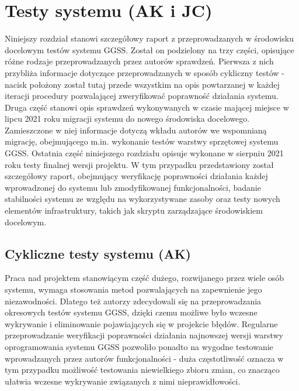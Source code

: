 \chapter{Testy systemu (AK i JC)}
\label{cha:tests}
Niniejszy rozdział stanowi szczegółowy raport z przeprowadzanych w środowisku docelowym testów systemu GGSS. Został on podzielony na trzy części, opisujące różne rodzaje przeprowadzanych przez autorów sprawdzeń. Pierwsza z nich przybliża informacje dotyczące przeprowadzanych w sposób cykliczny testów - nacisk położony został tutaj przede wszystkim na opis powtarzanej w każdej iteracji procedury pozwalającej zweryfikować poprawność działania systemu. Druga część stanowi opis sprawdzeń wykonywanych w czasie mającej miejsce w lipcu 2021 roku migracji systemu do nowego środowiska docelowego. Zamieszczone w niej informacje dotyczą wkładu autorów we wspomnianą migrację, obejmującego m.in. wykonanie testów warstwy sprzętowej systemu GGSS. Ostatnia część niniejszego rozdziału opisuje wykonane w sierpniu 2021 roku testy finalnej wersji projektu. W tym przypadku przedstawiony został szczegółowy raport, obejmujący weryfikację poprawności działania każdej wprowadzonej do systemu lub zmodyfikowanej funkcjonalności, badanie stabilności systemu ze względu na wykorzystywane zasoby oraz testy nowych elementów infrastruktury, takich jak skryptu zarządzające środowiskiem docelowym.

\section{Cykliczne testy systemu (AK)}
Praca nad projektem stanowiącym część dużego, rozwijanego przez wiele osób systemu, wymaga stosowania metod pozwalających na zapewnienie jego niezawodności. Dlatego też autorzy zdecydowali się na przeprowadzania okresowych testów systemu GGSS, dzięki czemu możliwe było wczesne wykrywanie i eliminowanie pojawiających się w projekcie błędów. Regularne przeprowadzanie weryfikacji poprawności działania najnowszej wersji warstwy oprogramowania systemu GGSS pozwoliło ponadto na wygodne testowanie wprowadzanych przez autorów funkcjonalności - duża częstotliwość oznacza w tym przypadku możliwość testowania niewielkiego zbioru zmian, co znacząco ułatwia wczesne wykrywanie związanych z nimi nieprawidłowości.



